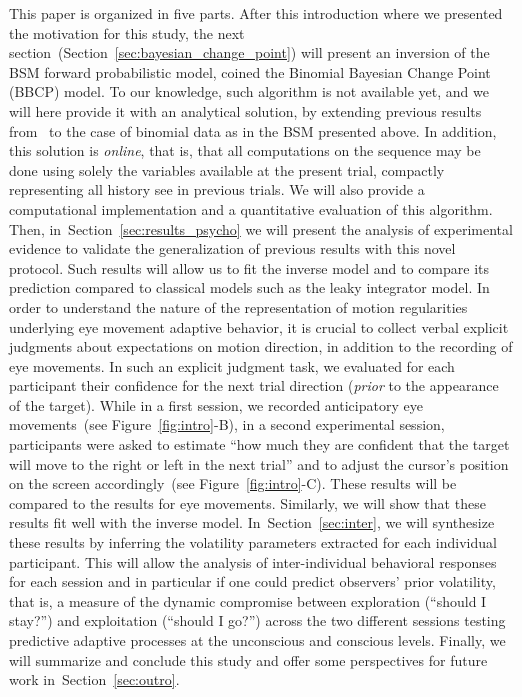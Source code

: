 \documentclass[12pt,english]{article}%
\newcommand{\citet}[1]{\textcite{#1}}
\newcommand{\seeFig}[1]{Figure~\ref{fig:#1}}
\newcommand{\seeSec}[1]{Section~\ref{sec:#1}}
\begin{document}
This paper is organized in five parts.
After this introduction where we presented the motivation for this study,
the next section~(\seeSec{bayesian_change_point}) will present
an inversion of the BSM forward probabilistic model,
coined the Binomial Bayesian Change Point (BBCP) model.
To our knowledge, such algorithm is not available yet, and
we will here provide it with an analytical solution,
by extending previous results from~\citet{AdamsMackay2007}
to the case of binomial data as in the BSM presented above.
In addition, this solution is \emph{online},
that is, that all computations on the sequence may be done
using solely the variables available at the present trial,
compactly representing all history see in previous trials.
We will also provide a computational implementation
and a quantitative evaluation of this algorithm.
Then, in~\seeSec{results_psycho} we will present the analysis of experimental evidence
to validate the generalization of previous results %
with this novel protocol. %
Such results will allow us to fit the inverse model and to compare
its prediction compared to classical models such as the leaky integrator model.
In order to understand the nature of the representation of motion regularities underlying eye movement adaptive behavior, it is crucial to collect verbal explicit judgments about expectations on motion direction, in addition to the recording of eye movements.
In such an explicit judgment task, we evaluated for each participant their confidence for the next trial direction
(\emph{prior} to the appearance of the target).
While in a first session, we recorded anticipatory eye movements~(see \seeFig{intro}-B), 
in a second experimental session, participants were asked to estimate
``how much they are confident that
the target will move to the right or left in the next trial'' and
to adjust the cursor's position on the screen accordingly~(see \seeFig{intro}-C).
These results will be compared to the results for eye movements.
Similarly, we will show that these results fit well
with the inverse model.
In~\seeSec{inter}, we will synthesize these results
by inferring the volatility parameters extracted
for each individual participant. %
This will allow the analysis of inter-individual behavioral responses for each session
and in particular if one could predict observers' prior volatility,
that is, a measure of the dynamic compromise between exploration (``should I stay?'')
and exploitation (``should I go?'')
across the two different sessions testing predictive adaptive processes
at the unconscious and conscious levels.
Finally, we will summarize and conclude this study and
offer some perspectives for future work in~\seeSec{outro}.
%
\end{document}
